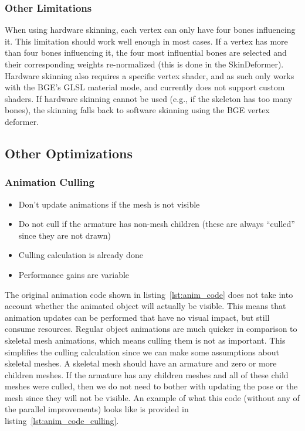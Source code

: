 \subsubsection{Other Limitations}

When using hardware skinning, each vertex can only have four bones influencing it.
This limitation should work well enough in most cases.
If a vertex has more than four bones influencing it, the four most influential bones are selected and their corresponding weights re-normalized (this is done in the SkinDeformer).
Hardware skinning also requires a specific vertex shader, and as such only works with the BGE's GLSL material mode, and currently does not support custom shaders.
If hardware skinning cannot be used (e.g., if the skeleton has too many bones), the skinning falls back to software skinning using the BGE vertex deformer.


\subsection{Other Optimizations}
\subsubsection{Animation Culling}
\ifsummaries
\begin{itemize}
 \item Don't update animations if the mesh is not visible
 \item Do not cull if the armature has non-mesh children (these are always ``culled'' since they are not drawn)
 \item Culling calculation is already done
 \item Performance gains are variable
\end{itemize}
\fi

The original animation code shown in listing~\ref{lst:anim_code} does not take into account whether the animated object will actually be visible.
This means that animation updates can be performed that have no visual impact, but still consume resources.
Regular object animations are much quicker in comparison to skeletal mesh animations, which means culling them is not as important.
This simplifies the culling calculation since we can make some assumptions about skeletal meshes.
A skeletal mesh should have an armature and zero or more children meshes.
If the armature has any children meshes and all of these child meshes were culled, then we do not need to bother with updating the pose or the mesh since they will not be visible.
An example of what this code (without any of the parallel improvements) looks like is provided in listing~\ref{lst:anim_code_culling}.


